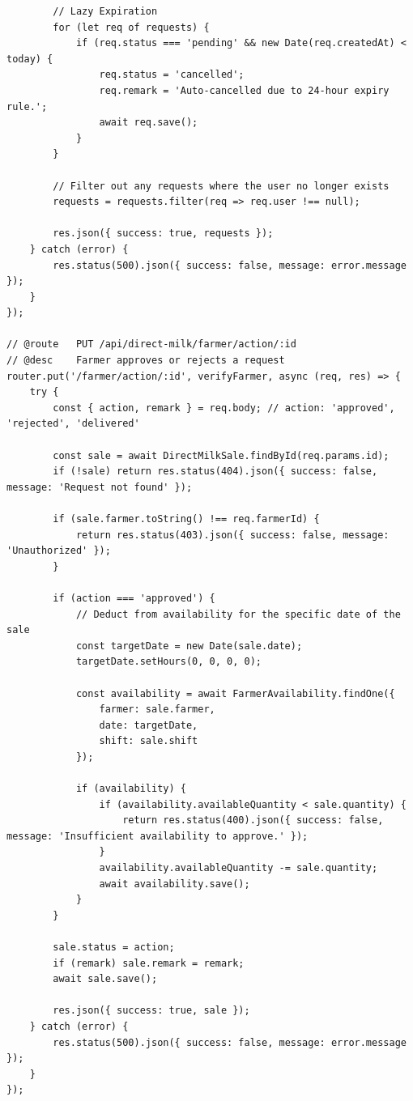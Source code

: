 \documentclass[12pt,a4paper]{report}
\begin{document}
\begin{lstlisting}
        // Lazy Expiration
        for (let req of requests) {
            if (req.status === 'pending' && new Date(req.createdAt) < today) {
                req.status = 'cancelled';
                req.remark = 'Auto-cancelled due to 24-hour expiry rule.';
                await req.save();
            }
        }

        // Filter out any requests where the user no longer exists
        requests = requests.filter(req => req.user !== null);

        res.json({ success: true, requests });
    } catch (error) {
        res.status(500).json({ success: false, message: error.message });
    }
});

// @route   PUT /api/direct-milk/farmer/action/:id
// @desc    Farmer approves or rejects a request
router.put('/farmer/action/:id', verifyFarmer, async (req, res) => {
    try {
        const { action, remark } = req.body; // action: 'approved', 'rejected', 'delivered'

        const sale = await DirectMilkSale.findById(req.params.id);
        if (!sale) return res.status(404).json({ success: false, message: 'Request not found' });

        if (sale.farmer.toString() !== req.farmerId) {
            return res.status(403).json({ success: false, message: 'Unauthorized' });
        }

        if (action === 'approved') {
            // Deduct from availability for the specific date of the sale
            const targetDate = new Date(sale.date);
            targetDate.setHours(0, 0, 0, 0);

            const availability = await FarmerAvailability.findOne({
                farmer: sale.farmer,
                date: targetDate,
                shift: sale.shift
            });

            if (availability) {
                if (availability.availableQuantity < sale.quantity) {
                    return res.status(400).json({ success: false, message: 'Insufficient availability to approve.' });
                }
                availability.availableQuantity -= sale.quantity;
                await availability.save();
            }
        }

        sale.status = action;
        if (remark) sale.remark = remark;
        await sale.save();

        res.json({ success: true, sale });
    } catch (error) {
        res.status(500).json({ success: false, message: error.message });
    }
});


\end{lstlisting}
\end{document}
